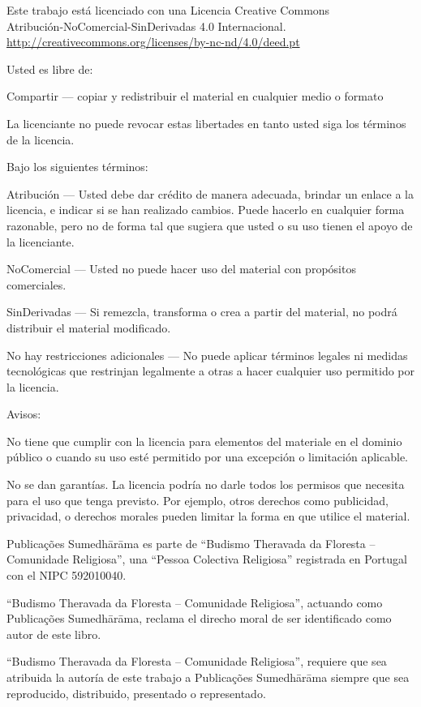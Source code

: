 
\thispagestyle{plain}

{\small
\setlength{\parindent}{0pt}%
\raggedright\label{copyright-details}
\setlength{\parskip}{10pt}
{\centering

{\LARGE\ccbyncnd}

Este trabajo está licenciado con una Licencia Creative Commons\\
Atribución-NoComercial-SinDerivadas 4.0 Internacional.\\
\url{http://creativecommons.org/licenses/by-nc-nd/4.0/deed.pt}

}

Usted es libre de:

\begin{packeditemize}
\item Compartir — copiar y redistribuir el material en cualquier medio o formato
\end{packeditemize}

La licenciante no puede revocar estas libertades en tanto usted siga los términos de la licencia.

Bajo los siguientes términos:

\begin{packeditemize}
\item Atribución — Usted debe dar crédito de manera adecuada, brindar un enlace a la licencia, e indicar si se han realizado cambios. Puede hacerlo en cualquier forma razonable, pero no de forma tal que sugiera que usted o su uso tienen el apoyo de la licenciante.
\item NoComercial — Usted no puede hacer uso del material con propósitos comerciales.
\item SinDerivadas — Si remezcla, transforma o crea a partir del material, no podrá distribuir el material modificado.
\end{packeditemize}

No hay restricciones adicionales — No puede aplicar términos legales ni medidas tecnológicas que restrinjan legalmente a otras a hacer cualquier uso permitido por la licencia.

Avisos:

No tiene que cumplir con la licencia para elementos del materiale en el dominio público o cuando su uso esté permitido por una excepción o limitación aplicable.

No se dan garantías. La licencia podría no darle todos los permisos que necesita para el uso que tenga previsto. Por ejemplo, otros derechos como publicidad, privacidad, o derechos morales pueden limitar la forma en que utilice el material.

Publicações Sumedhārāma es parte de ``Budismo Theravada da Floresta -- Comunidade Religiosa'', una ``Pessoa Colectiva Religiosa'' registrada en Portugal con el NIPC 592010040.

``Budismo Theravada da Floresta -- Comunidade Religiosa'', actuando como Publicações Sumedhārāma, reclama el direcho moral de ser identiﬁcado como autor de este libro.

``Budismo Theravada da Floresta -- Comunidade Religiosa'', requiere que sea atribuida la autoría de este trabajo a Publicações Sumedhārāma siempre que sea reproducido, distribuido, presentado o representado.

}
